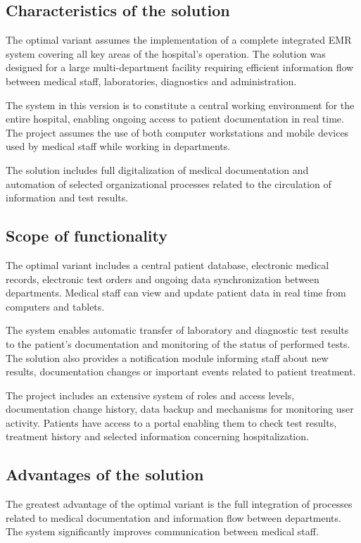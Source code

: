     \subsection{Characteristics of the solution}
    The optimal variant assumes the implementation of a complete integrated EMR system covering all key areas of the hospital's operation. The solution was designed for a large multi-department facility requiring efficient information flow between medical staff, laboratories, diagnostics and administration.

    The system in this version is to constitute a central working environment for the entire hospital, enabling ongoing access to patient documentation in real time. The project assumes the use of both computer workstations and mobile devices used by medical staff while working in departments.

    The solution includes full digitalization of medical documentation and automation of selected organizational processes related to the circulation of information and test results.

    \subsection{Scope of functionality}
    The optimal variant includes a central patient database, electronic medical records, electronic test orders and ongoing data synchronization between departments. Medical staff can view and update patient data in real time from computers and tablets.

    The system enables automatic transfer of laboratory and diagnostic test results to the patient's documentation and monitoring of the status of performed tests. The solution also provides a notification module informing staff about new results, documentation changes or important events related to patient treatment.

    The project includes an extensive system of roles and access levels, documentation change history, data backup and mechanisms for monitoring user activity. Patients have access to a portal enabling them to check test results, treatment history and selected information concerning hospitalization.


    \subsection{Advantages of the solution}
    The greatest advantage of the optimal variant is the full integration of processes related to medical documentation and information flow between departments. The system significantly improves communication between medical staff.

